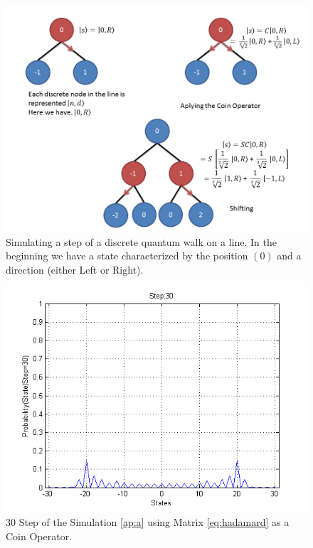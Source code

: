 \begin{figure}[h]
\centering 

\includegraphics[scale=0.50]{Figures/quantum_walk_line.png}
\caption{Simulating a step of a discrete quantum walk on a line. In the beginning we have a state characterized by the position $(0)$ and a direction (either Left or Right).}
\label{fig:qwl_tree}
\end{figure}




\begin{figure}[h]
\centering 
\includegraphics[scale=0.50]{Figures/quantum_walk_line_symetric.png}
\caption{30 Step of the Simulation \ref{ap:a} using Matrix \eqref{eq:hadamard} as a Coin Operator.}
\label{fig:qwl_symetric}
\end{figure}

